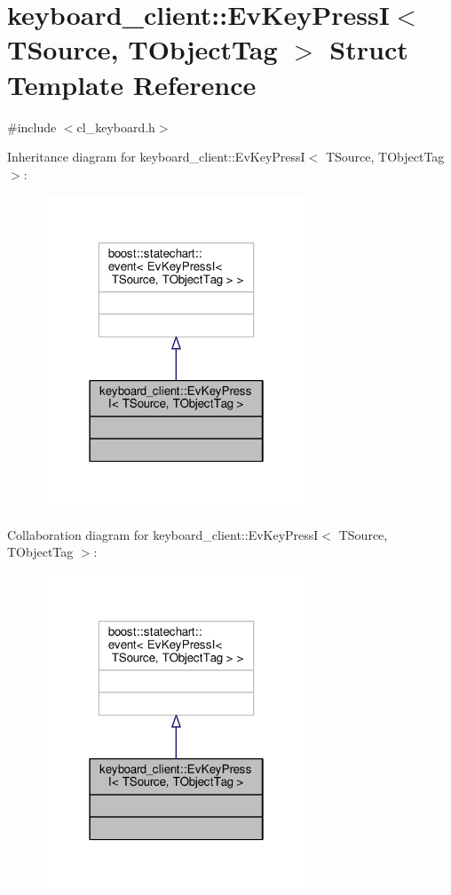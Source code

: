 \hypertarget{structkeyboard__client_1_1EvKeyPressI}{}\section{keyboard\+\_\+client\+:\+:Ev\+Key\+PressI$<$ T\+Source, T\+Object\+Tag $>$ Struct Template Reference}
\label{structkeyboard__client_1_1EvKeyPressI}


{\ttfamily \#include $<$cl\+\_\+keyboard.\+h$>$}



Inheritance diagram for keyboard\+\_\+client\+:\+:Ev\+Key\+PressI$<$ T\+Source, T\+Object\+Tag $>$\+:\nopagebreak
\begin{figure}[H]
\begin{center}
\leavevmode
\includegraphics[width=226pt]{structkeyboard__client_1_1EvKeyPressI__inherit__graph}
\end{center}
\end{figure}


Collaboration diagram for keyboard\+\_\+client\+:\+:Ev\+Key\+PressI$<$ T\+Source, T\+Object\+Tag $>$\+:\nopagebreak
\begin{figure}[H]
\begin{center}
\leavevmode
\includegraphics[width=226pt]{structkeyboard__client_1_1EvKeyPressI__coll__graph}
\end{center}
\end{figure}


